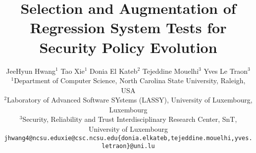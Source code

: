 \documentclass{sig-alternate}
\begin{document}
\title{Selection and Augmentation of Regression System Tests for Security Policy Evolution}
%
%
%
%
%

%

\author{
JeeHyun Hwang$^1$ \hspace*{0.15in} Tao Xie$^1$\hspace*{0.15in} Donia El Kateb$^2$ \hspace*{0.15in} Tejeddine Mouelhi$^3$  \hspace*{0.15in} Yves Le Traon$^3$\\
$^1$\small{Department of Computer Science, North Carolina State University, Raleigh, USA}\\
$^2$\small{Laboratory of Advanced Software SYstems (LASSY), University of Luxembourg, Luxembourg}\\
$^3$\small{Security, Reliability and Trust Interdisciplinary Research Center, SnT, University of Luxembourg}\\
\small{\texttt{jhwang4@ncsu.edu}}\hspace*{0.3in}\small{\texttt{xie@csc.ncsu.edu}}\hspace*{0.3in}\small{\texttt{\{donia.elkateb,tejeddine.mouelhi,yves.letraon\}@uni.lu}}\\
}
\end{document}
